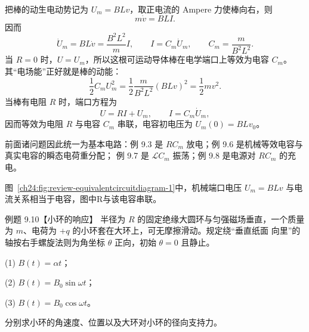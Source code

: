 \begin{xesolution}
把棒的动生电动势记为 $U_m=BLv$，取正电流的 Ampere 力使棒向右，则
\begin{equation}
  m\dot v=BLI.
\end{equation}
因而
\begin{equation}
  \dot U_m=BL\dot v=\frac{B^2L^2}{m}I,
  \qquad
  \boxed{I=C_m\dot U_m},
  \qquad
  \boxed{C_m=\frac{m}{B^2L^2}}.
\end{equation}
当 $R=0$ 时，$U=U_m$，所以这根可运动导体棒在电学端口上等效为电容 $C_m$。其“电场能”正好就是棒的动能：
\begin{equation}
  \frac12C_mU_m^2=\frac12\frac{m}{B^2L^2}(BLv)^2=\frac12mv^2.
\end{equation}
当棒有电阻 $R$ 时，端口方程为
\begin{equation}
  \boxed{U=RI+U_m},
  \qquad I=C_m\dot U_m,
\end{equation}
因而等效为电阻 $R$ 与电容 $C_m$ 串联，电容初电压为 $U_m(0)=BLv_0$。

前面诸问题因此统一为基本电路：例 9.3 是 $RC_m$ 放电；例 9.6 是机械等效电容与真实电容的瞬态电荷重分配；
例 9.7 是 $\mathcal LC_m$ 振荡；例 9.8 是电源对 $RC_m$ 的充电。

图~\ref{ch24:fig:review-equivalentcircuitdiagram-1}中，机械端口电压 $U_m=BLv$ 与电流关系相当于电容，图中R与该电容串联。
\par\noindent\begin{minipage}{\linewidth}
\equivalentCircuitDiagram
{}\label{ch24:fig:review-equivalentcircuitdiagram-1}
\end{minipage}\par\medskip
\end{xesolution}

\begin{origexamplebox}{例题 9.10【小环的响应】}
半径为 $R$ 的固定绝缘大圆环与匀强磁场垂直，一个质量为 $m$、电荷为 $+q$ 的小环套在大环上，可无摩擦滑动。规定绕“垂直纸面
向里”的轴按右手螺旋法则为角坐标 $\theta$ 正向，初始 $\theta=0$ 且静止。

(1) $B(t)=\alpha t$；

(2) $B(t)=B_0\sin\omega t$；

(3) $B(t)=B_0\cos\omega t$。

分别求小环的角速度、位置以及大环对小环的径向支持力。
\par\noindent\begin{minipage}{\linewidth}
\chargedRingDiagram
{}\label{ch24:fig:review-chargedringdiagram-1}
\end{minipage}\par\medskip
\end{origexamplebox}

